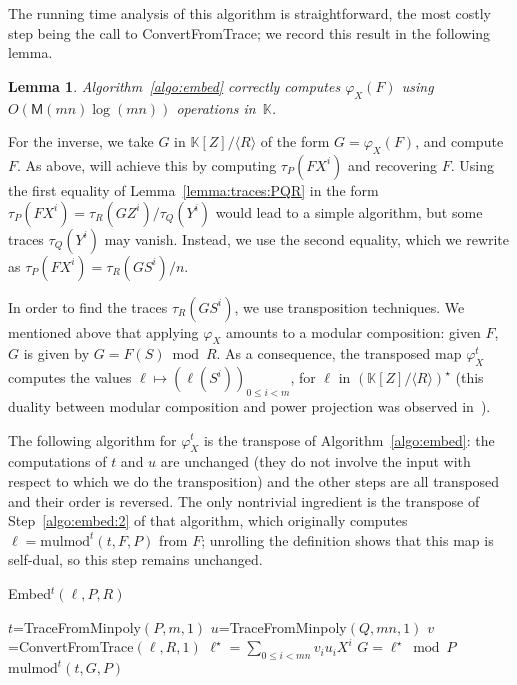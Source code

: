 \documentclass[12pt]{article}
\def\M {\ensuremath{\mathsf{M}}}
\def\K {\ensuremath{\mathbb{K}}}
\def\mulmod {\ensuremath{\mathrm{mulmod}}}
\newtheorem{Lemma}{Lemma}
\begin{document}
The running time analysis of this algorithm is straightforward, the most
costly step being the call to ConvertFromTrace; we record this result in 
the following lemma. 

\begin{Lemma}\label{lemma:algo:embed}
  Algorithm~\ref{algo:embed} correctly computes $\varphi_X(F)$
  using $O(\M(mn)\log(mn))$ operations in~$\K$.
\end{Lemma}



For the inverse, we take $G$ in $\K[Z]/\langle R \rangle$ of the form
$G=\varphi_X(F)$, and compute $F$. As above, will achieve this by
computing $\tau_P(F X^i)$ and recovering $F$. Using the first equality
of Lemma~\ref{lemma:traces:PQR} in the form $\tau_P(F X^i) =\tau_R(G
Z^i)/\tau_Q(Y^i)$ would lead to a simple algorithm, but some traces
$\tau_Q(Y^i)$ may vanish. Instead, we use the second equality, which
we rewrite as $\tau_P(F X^i) =\tau_R(G S^i)/n$.

In order to find the traces $\tau_R(G S^i)$, we use transposition
techniques. We mentioned above that applying $\varphi_X$ amounts to a
modular composition: given $F$, $G$ is given by $G= F(S) \bmod R$. As
a consequence, the transposed map $\varphi_X^t$ computes the values
$\ell \mapsto (\ell(S^i))_{0 \le i < m}$, for $\ell$ in
$(\K[Z]/\langle R \rangle)^\star$ (this duality between modular
composition and power projection was observed in~\cite{shoup94}).

The following algorithm for $\varphi_X^t$ is the transpose of
Algorithm~\ref{algo:embed}: the computations of $t$ and $u$ are
unchanged (they do not involve the input with respect to which we do
the transposition) and the other steps are all transposed and their
order is reversed. The only nontrivial ingredient is the transpose of
Step~\ref{algo:embed:2} of that algorithm, which originally computes
$\ell= \mulmod^t(t,F,P)$ from $F$; unrolling the definition shows that
this map is self-dual, so this step remains unchanged.

\begin{algorithm}[H]
  \caption{Embed$^t(\ell,P,R)$}
  \begin{algorithmic}[1]
  \STATE $t$=TraceFromMinpoly$(P,m,1)$
  \STATE $u$=TraceFromMinpoly$(Q,mn,1)$
  \STATE $v$=ConvertFromTrace$(\ell, R, 1)$
  \STATE $\ell^\star=\sum_{0 \le i < mn} v_i u_i X^i$
  \STATE $G = \ell^\star \bmod P$
  \RETURN $\mulmod^t(t,G,P)$
  \end{algorithmic}\label{algo:embedT}
\end{algorithm}
\end{document}
